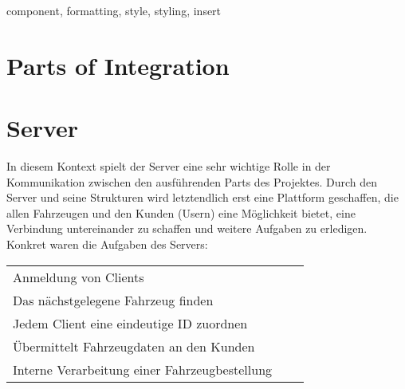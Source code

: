 \documentclass[conference]{IEEEtran}
\begin{document}
\begin{IEEEkeywords}
component, formatting, style, styling, insert
\end{IEEEkeywords}

\newpage
\section{Parts of Integration}
\section{Server}
In diesem Kontext spielt der Server eine sehr wichtige Rolle in der Kommunikation zwischen den ausführenden Parts des Projektes. Durch den Server und seine Strukturen wird letztendlich erst eine Plattform geschaffen, die allen Fahrzeugen und den Kunden (Usern) eine Möglichkeit bietet, eine Verbindung untereinander zu schaffen und weitere Aufgaben zu erledigen. Konkret waren die Aufgaben des Servers: 
\begin{table}[h]
\begin{tabular}{lcr}
Anmeldung von Clients\\
Das nächstgelegene Fahrzeug finden\\
Jedem Client eine eindeutige ID zuordnen \\
Übermittelt Fahrzeugdaten an den Kunden\\
Interne Verarbeitung einer Fahrzeugbestellung\\
\end{tabular}
\end{table}
\end{document}
